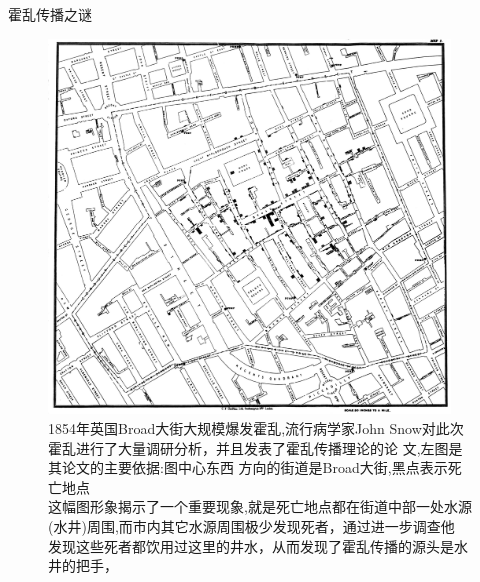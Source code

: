 \documentclass{beamerthemeMono}
\begin{document}
\begin{frame}{\subsecname}{霍乱传播之谜}

  \begin{figure}
    \begin{columns}
      \begin{column}{.6\textwidth}
        \includegraphics[width=\columnwidth]{Snow_cholera_map.jpg}
      \end{column}

      \begin{column}{.35\textwidth}
        \centering
        \caption{1854年英国Broad大街大规模爆发霍乱,流行病学家John
          Snow对此次霍乱进行了大量调研分析，并且发表了霍乱传播理论的论
          文,左图是其论文的主要依据:图中心东西
          方向的街道是Broad大街,黑点表示死亡地点\\
          这幅图形象揭示了一个重要现象,就是死亡地点都在街道中部一处水源
          (水井)周围,而市内其它水源周围极少发现死者，通过进一步调查他
          发现这些死者都饮用过这里的井水，从而发现了霍乱传播的源头是水
          井的把手，}
      \end{column}
    \end{columns}
  \end{figure}

\end{frame}
\end{document}
